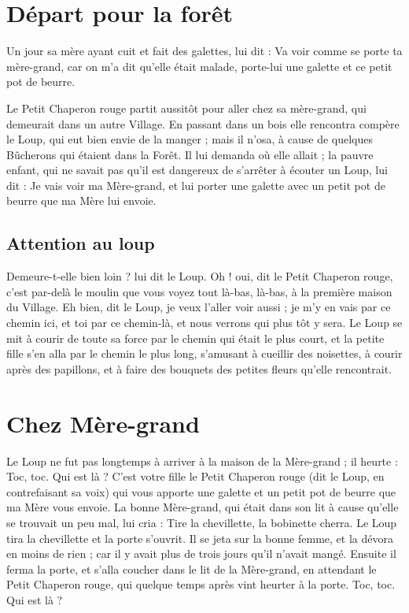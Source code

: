 \documentclass[a4paper,11pt]{article}
\begin{document}
\section{Départ pour la forêt}\label{sectiondepart}
Un jour sa mère ayant cuit et fait des galettes, lui dit :
Va voir comme se porte ta mère-grand, car on m'a dit qu'elle était malade, porte-lui une galette et ce petit pot de beurre.
\begin{multicols}{2}
Le Petit Chaperon rouge partit aussitôt pour aller chez sa mère-grand, qui demeurait dans un autre Village. En passant dans un bois elle rencontra compère le Loup, qui eut bien envie de la manger ; mais il n'osa, à cause de quelques Bûcherons qui étaient dans la Forêt. Il lui demanda où elle allait ; la pauvre enfant, qui ne savait pas qu'il est dangereux de s'arrêter à écouter un Loup, lui dit : Je vais voir ma Mère-grand, et lui porter une galette avec un petit pot de beurre que ma Mère lui envoie.
\end{multicols}

\subsection{Attention au loup}
Demeure-t-elle bien loin ? lui dit le Loup. Oh ! oui, dit le Petit Chaperon rouge, c'est par-delà le moulin que vous voyez tout là-bas, là-bas, à la première maison du Village. Eh bien, dit le Loup, je veux l'aller voir aussi ; je m'y en vais par ce chemin ici, et toi par ce chemin-là, et nous verrons qui plus tôt y sera. Le Loup se mit à courir de toute sa force par le chemin qui était le plus court, et la petite fille s'en alla par le chemin le plus long, s'amusant à cueillir des noisettes, à courir après des papillons, et à faire des bouquets des petites fleurs qu'elle rencontrait.

\section{Chez Mère-grand}\label{sectmeregrand}
\setlength{\parindent}{3\parindent}
Le Loup ne fut pas longtemps à arriver à la maison de la Mère-grand ; il heurte :
Toc, toc. Qui est là ? C'est votre fille le Petit Chaperon rouge (dit le Loup, en contrefaisant sa voix) qui vous apporte une galette et un petit pot de beurre que ma Mère vous envoie. La bonne Mère-grand, qui était dans son lit à cause qu'elle se trouvait un peu mal, lui cria : Tire la chevillette, la bobinette cherra.
Le Loup tira la chevillette et la porte s'ouvrit. Il se jeta sur la bonne femme, et la dévora en moins de rien ; car il y avait plus de trois jours qu'il n'avait mangé. Ensuite il ferma la porte, et s'alla coucher dans le lit de la Mère-grand, en attendant le Petit Chaperon rouge, qui quelque temps après vint heurter à la porte. Toc, toc. Qui est là ?
\end{document}
